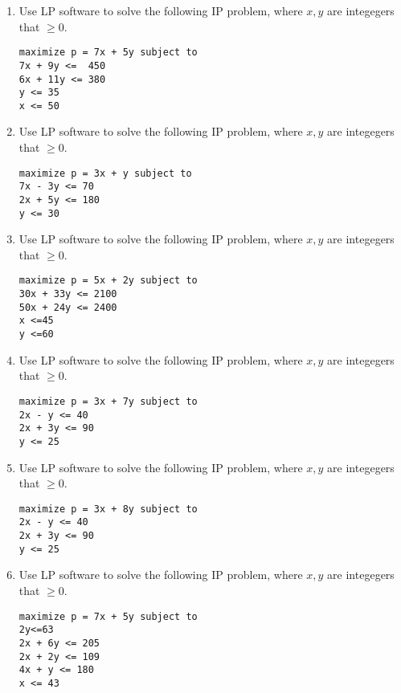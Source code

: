 \documentclass{article}
\begin{document}
\begin{enumerate}
\item Use LP software to solve the following IP problem, where $x,y$ are integegers that $\geq 0$.
\begin{framed}
\begin{verbatim}
maximize p = 7x + 5y subject to
7x + 9y <=  450
6x + 11y <= 380
y <= 35
x <= 50
\end{verbatim}
\end{framed}

\item Use LP software to solve the following IP problem, where $x,y$ are integegers that $\geq 0$.
\begin{framed}
\begin{verbatim}
maximize p = 3x + y subject to
7x - 3y <= 70
2x + 5y <= 180
y <= 30
\end{verbatim}
\end{framed}

\item Use LP software to solve the following IP problem, where $x,y$ are integegers that $\geq 0$.
\begin{framed}
\begin{verbatim}
maximize p = 5x + 2y subject to
30x + 33y <= 2100
50x + 24y <= 2400
x <=45
y <=60
\end{verbatim}
\end{framed}

\item Use LP software to solve the following IP problem, where $x,y$ are integegers that $\geq 0$.
\begin{framed}
\begin{verbatim}
maximize p = 3x + 7y subject to
2x - y <= 40
2x + 3y <= 90
y <= 25
\end{verbatim}
\end{framed}

\item Use LP software to solve the following IP problem, where $x,y$ are integegers that $\geq 0$.
\begin{framed}
\begin{verbatim}
maximize p = 3x + 8y subject to
2x - y <= 40
2x + 3y <= 90
y <= 25
\end{verbatim}
\end{framed}


\item Use LP software to solve the following IP problem, where $x,y$ are integegers that $\geq 0$.
\begin{framed}
\begin{verbatim}
maximize p = 7x + 5y subject to
2y<=63
2x + 6y <= 205
2x + 2y <= 109
4x + y <= 180
x <= 43
\end{verbatim}
\end{framed}

\end{enumerate}
\end{document}
